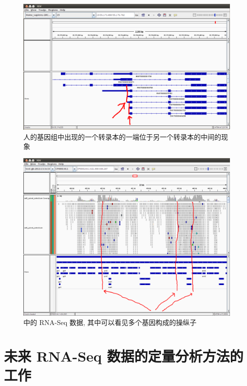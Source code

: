 \begin{figure}[!t]
\centering
\includegraphics[width=\textwidth]{figures/disc/disc-human-gene-alternative-start-1.png}
\caption{人的基因组中出现的一个转录本的一端位于另一个转录本的中间的现象}
\label{disc-human-gene-alternative-start-1}
\end{figure}

\begin{figure}[!t]
\centering
\includegraphics[width=\textwidth]{figures/disc/disc-bacteria-operons-1.png}
\caption{ 中的 RNA-Seq 数据, 
其中可以看见多个基因构成的操纵子}
\label{disc-bacteria-operons-1}
\end{figure}

\section{未来 RNA-Seq 数据的定量分析方法的工作}

